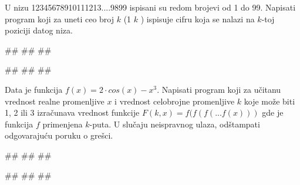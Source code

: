 \begin{Exercise}[label=p1.2_03] 
 U nizu 12345678910111213....9899 ispisani su redom brojevi od 1 do 99. Napisati program koji za uneti  ceo broj $k$ (1 \geq $k$ ) ispisuje cifru koja se nalazi na $k$-toj poziciji datog niza.
 
\begin{miditest}
\begin{upotreba}{1}
#\naslovInt#
##
##
\end{upotreba}
\end{miditest}
\begin{miditest}
\begin{upotreba}{2}
#\naslovInt#
##
##
\end{upotreba}
\end{miditest}

\end{Exercise}
\begin{Answer}[ref=p1.2_03]
\end{Answer}

\begin{Exercise}[label=p1.2_12] 
Data je funkcija $f(x) = 2 \cdot cos(x) - x^3$. Napisati program koji za učitanu vrednost realne promenljive $x$ i vrednost celobrojne promenljive $k$ koje može biti 1, 2 ili 3 izračunava
vrednost funkcije $F(k, x) = f(f(f(...f(x)))$ gde je funkcija $f$ primenjena $k$-puta.
U slučaju neispravnog ulaza, odštampati odgovarajuću poruku o grešci.

\begin{miditest}
\begin{upotreba}{1}
#\naslovInt#
##
##
\end{upotreba}
\end{miditest}
\begin{miditest}
\begin{upotreba}{2}
#\naslovInt#
##
##
\end{upotreba}
\end{miditest}

\end{Exercise}
\begin{Answer}[ref=p1.2_12]
\end{Answer}


